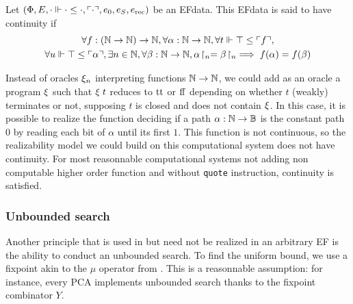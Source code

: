 \documentclass[a4paper,UKenglish,cleveref, autoref, thm-restate]{lipics-v2021}
\begin{document}
\begin{definition}[Continuity]
  Let $(\Phi,E,\cdot \Vdash \cdot \leq \cdot, \ulcorner\cdot\urcorner, e_0,e_S,e_{\mathrm{rec}})$ be an EFdata. This EFdata is said to have continuity if
  \begin{multline*}
    \forall f : (\mathbb N \to \mathbb N) \to \mathbb N, \forall \alpha : \mathbb N \to \mathbb N, \forall t \Vdash \top \leq \ulcorner f\urcorner,
    \\\forall u \Vdash \top \leq \ulcorner\alpha\urcorner, \exists n \in \mathbb N,
    \forall \beta:\mathbb N\to\mathbb N,{\alpha}\!\upharpoonright_{n} = {\beta}\!\upharpoonright_{n} \implies f(\alpha) = f(\beta)
  \end{multline*}
\end{definition}
\begin{example}
Instead of oracles $\xi_n$ interpreting functions $\mathbb N \to \mathbb N$, we could add as an oracle a program $\xi$ such that $\xi\;t$ reduces to $\mathrm{tt}$ or $\mathrm{ff}$ depending on whether $t$ (weakly) terminates or not, supposing $t$ is closed and does not contain $\xi$. In this case, it is possible to realize the function deciding if a path $\alpha : \mathbb N \to \mathbb B$ is the constant path $0$ by reading each bit of $\alpha$ until its first $1$. This function is not continuous, so the realizability model we could build on this computational system does not have continuity. For most reasonnable computational systems not adding non computable higher order function and without \texttt{quote} instruction, continuity is satisfied.
\end{example}


\subsubsection{Unbounded search}

Another principle that is used in  but need not be realized in an arbitrary EF is the ability to conduct an unbounded search. To find the uniform bound, we use a fixpoint akin to the $\mu$ operator from \cite{Kleene1943}. This is a reasonnable assumption: for instance, every PCA implements unbounded search thanks to the fixpoint combinator $Y$.
\end{document}
